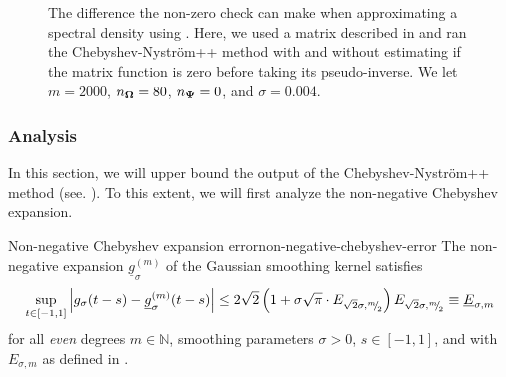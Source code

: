 \begin{figure}[ht]
    \centering
    
    \caption{The difference the non-zero check can make when approximating a spectral density using . Here, we used a matrix described in  and ran the Chebyshev-Nyström++ method with and without estimating if the matrix function is zero before taking its pseudo-inverse. We let $m=2000$, $n_{\boldsymbol{\Omega}}=80$, $n_{\boldsymbol{\Psi}}=0$, and $\sigma = 0.004$.}
    \label{fig:zerocheck}
\end{figure}

\subsubsection{Analysis}
\label{subsubsec:chebyshev-nystrom-analysis}

In this section, we will upper bound the output of the Chebyshev-Nyström++ method (see. ). To this extent, we will first analyze the non-negative Chebyshev expansion.

\begin{lemma}{Non-negative Chebyshev expansion error}{non-negative-chebyshev-error}
    The non-negative expansion $\underline{g}_{\sigma}^{(m)}$ of the Gaussian smoothing kernel satisfies
    \begin{equation}
        \sup_{t \in [-1, 1]} \left| g_{\sigma}(t - s) - \underline{g}_{\sigma}^{(m)}(t - s) \right| \leq 2\sqrt{2} \left(1 + \sigma \sqrt{\pi} \cdot E_{\sqrt{2}\sigma, {}^{m}{\mskip -5mu/\mskip -3mu}_{2}}\right) E_{\sqrt{2}\sigma, {}^{m}{\mskip -5mu/\mskip -3mu}_{2}} \equiv \underline{E}_{\sigma, m}
        \label{equ:chebyshev-interpolation-sup-error-kernel-nonneg}
    \end{equation}
    for all \emph{even} degrees $m \in \mathbb{N}$, smoothing parameters $\sigma > 0$, $s \in [-1, 1]$, and with $E_{\sigma, m}$ as defined in .
\end{lemma}

